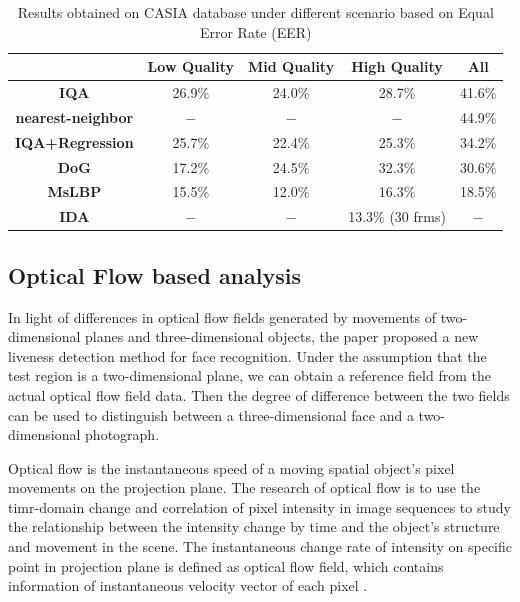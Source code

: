 \documentclass[journal]{IEEEtran}
\begin{document}
\begin{table}[!htbp]
\centering
\caption{Results obtained on CASIA database under different scenario based on Equal Error Rate (EER) \cite{li2016face}}
\label{tab.b.2.result}
\begin{tabular}{ccccc}
\toprule
& Low Quality & Mid Quality & High Quality & All \\
\midrule
\textbf{IQA\cite{galbally2014image}} & 26.9\% & 24.0\% & 28.7\% & 41.6\%\\
\textbf{nearest-neighbor} & $-$ & $-$ & $-$ & 44.9\% \\
\textbf{IQA+Regression} & 25.7\% & 22.4\% & 25.3\% & 34.2\% \\
\midrule
\textbf{DoG\cite{zhang2012face}} & 17.2\% & 24.5\% & 32.3\% & 30.6\% \\
\textbf{MsLBP\cite{maatta2011face}} & 15.5\% & 12.0\% & 16.3\% & 18.5\% \\
\textbf{IDA\cite{wen2015face}} & $−$ & $−$ & 13.3\% (30 frms) & $−$ \\
\bottomrule
\end{tabular}
\end{table}

\subsection{Optical Flow based analysis}

In light of differences in optical flow fields generated by movements of two-dimensional planes and three-dimensional objects, the paper \cite{Bao2009A} proposed a new liveness detection method for face recognition. Under the assumption that the test region is a two-dimensional plane, we can obtain a reference field from the actual optical flow field data. Then the degree of difference between the two fields can be used to distinguish between a three-dimensional face and a two-dimensional photograph.

Optical flow is the instantaneous speed of a moving spatial object's pixel movements on the projection plane. The research of optical flow is to use the timr-domain change and correlation of pixel intensity in image sequences to study the relationship between the intensity change by time and the object's structure and movement in the scene. The instantaneous change rate of intensity on specific point in projection plane is defined as optical flow field, which contains information of instantaneous velocity vector of each pixel \cite{Barron1994Performance}.
\end{document}
